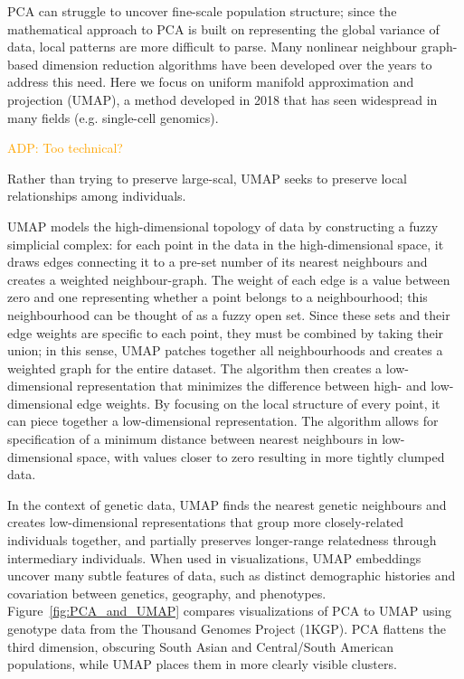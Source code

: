\documentclass[12pt]{article}
\newcommand{\adpcomment}[1]{{\textcolor{orange}{ADP: #1}}}
\begin{document}
PCA can struggle to uncover fine-scale population structure; since the mathematical approach to PCA is built on representing the global variance of data, local patterns are more difficult to parse. Many nonlinear neighbour graph-based dimension reduction algorithms have been developed over the years to address this need. Here we focus on uniform manifold approximation and projection (UMAP)\cite{mcinnes_umap_2018}, a method developed in 2018 that has seen widespread in many fields (e.g. single-cell genomics\cite{becht_dimensionality_2019}). 

\adpcomment{Too technical?}

Rather than trying to preserve large-scal, UMAP seeks to preserve local relationships among individuals.  

UMAP models the high-dimensional topology of data by constructing a fuzzy simplicial complex: for each point in the data in the high-dimensional space, it draws edges connecting it to a pre-set number of its nearest neighbours and creates a weighted neighbour-graph. The weight of each edge is a value between zero and one representing whether a point belongs to a neighbourhood; this neighbourhood can be thought of as a fuzzy open set. Since these sets and their edge weights are specific to each point, they must be combined by taking their union; in this sense, UMAP patches together all neighbourhoods and creates a weighted graph for the entire dataset. The algorithm then creates a low-dimensional representation that minimizes the difference between high- and low-dimensional edge weights. By focusing on the local structure of every point, it can piece together a low-dimensional representation. The algorithm allows for specification of a minimum distance between nearest neighbours in low-dimensional space, with values closer to zero resulting in more tightly clumped data.

In the context of genetic data, UMAP finds the nearest genetic neighbours and creates low-dimensional representations that group more closely-related individuals together, and partially preserves longer-range relatedness through intermediary individuals. When used in visualizations, UMAP embeddings uncover many subtle features of data, such as distinct demographic histories and covariation between genetics, geography, and phenotypes\cite{diaz-papkovich_umap_2019}. Figure~\ref{fig:PCA_and_UMAP} compares visualizations of PCA to UMAP using genotype data from the Thousand Genomes Project (1KGP)\cite{10002015global}. PCA flattens the third dimension, obscuring South Asian and Central/South American populations, while UMAP places them in more clearly visible clusters.
\end{document}
